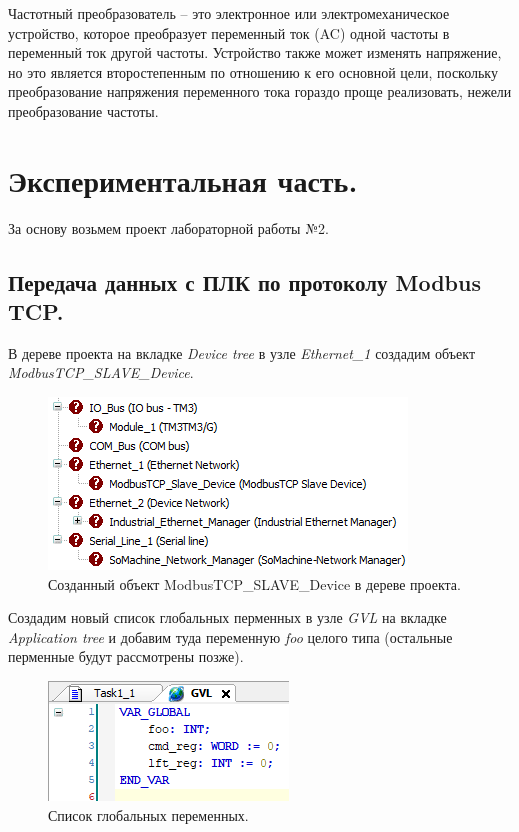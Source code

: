 \documentclass[a4paper, 12pt]{article}
\begin{document}
    Частотный преобразователь – это электронное или
    электромеханическое устройство, которое преобразует переменный ток
    (AC) одной частоты в переменный ток другой частоты. Устройство
    также может изменять напряжение, но это является второстепенным по
    отношению к его основной цели, поскольку преобразование
    напряжения переменного тока гораздо проще реализовать, нежели
    преобразование частоты.


    \section{Экспериментальная часть.}
    За основу возьмем проект лабораторной работы №2.
    
    
    \subsection{Передача данных с ПЛК по протоколу Modbus TCP.}
    В дереве проекта на вкладке \textit{Device tree} в узле
    \textit{Ethernet\_{1}} создадим объект \textit{ModbusTCP\_{SLAVE}\_{Device}}.
    \begin{figure}[H]
        \centering
        \includegraphics[scale=1]{modbus_tree.png}
        \captionsetup{skip=0pt}
        \caption{Созданный объект ModbusTCP\_{SLAVE}\_{Device} в дереве проекта.}
        \label{fig:mtree}
    \end{figure}


    Создадим новый список глобальных перменных в узле \textit{GVL} на
    вкладке \textit{Application tree} и добавим туда переменную \textit{foo} целого типа (остальные перменные
    будут рассмотрены позже).
    \begin{figure}[H]
        \centering
        \includegraphics[scale=1.375]{global.png}
        \captionsetup{skip=0pt}
        \caption{Список глобальных переменных.}
        \label{fig:gvl}
    \end{figure}
\end{document}
